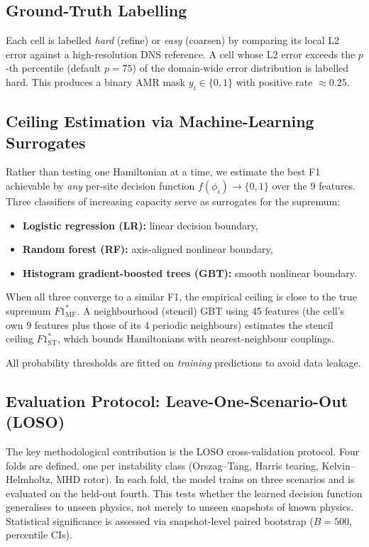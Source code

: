 \documentclass[12pt, a4paper, oneside]{report}
\begin{document}
\subsection{Ground-Truth Labelling}

Each cell is labelled \textit{hard} (refine) or \textit{easy} (coarsen) by comparing its local L2 error against a high-resolution DNS reference. A cell whose L2 error exceeds the $p$-th percentile (default $p = 75$) of the domain-wide error distribution is labelled hard. This produces a binary AMR mask $y_i \in \{0,1\}$ with positive rate $\approx 0.25$.

\subsection{Ceiling Estimation via Machine-Learning Surrogates}

Rather than testing one Hamiltonian at a time, we estimate the best F1 achievable by \textit{any} per-site decision function $f(\phi_i) \to \{0,1\}$ over the 9 features. Three classifiers of increasing capacity serve as surrogates for the supremum:
\begin{itemize}
    \item \textbf{Logistic regression (LR):} linear decision boundary,
    \item \textbf{Random forest (RF):} axis-aligned nonlinear boundary,
    \item \textbf{Histogram gradient-boosted trees (GBT):} smooth nonlinear boundary.
\end{itemize}
When all three converge to a similar F1, the empirical ceiling is close to the true supremum $F1^*_\text{MF}$. A neighbourhood (stencil) GBT using 45 features (the cell's own 9 features plus those of its 4 periodic neighbours) estimates the stencil ceiling $F1^*_\text{ST}$, which bounds Hamiltonians with nearest-neighbour couplings.

All probability thresholds are fitted on \textit{training} predictions to avoid data leakage.

\subsection{Evaluation Protocol: Leave-One-Scenario-Out (LOSO)}

The key methodological contribution is the LOSO cross-validation protocol. Four folds are defined, one per instability class (Orszag--Tang, Harris tearing, Kelvin--Helmholtz, MHD rotor). In each fold, the model trains on three scenarios and is evaluated on the held-out fourth. This tests whether the learned decision function generalises to unseen physics, not merely to unseen snapshots of known physics. Statistical significance is assessed via snapshot-level paired bootstrap ($B = 500$, percentile CIs).
\end{document}
